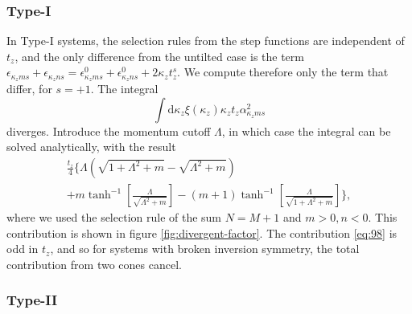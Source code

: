 \subsubsection{Type-I}
In Type-I systems, the selection rules from the step functions are independent of \( t_z \), and the only difference from the untilted case is the term \( \epsilon_{\kappa_z m s} + \epsilon_{\kappa_z n s} = \epsilon^0_{\kappa_z m s} + \epsilon^0_{\kappa_z n s} + 2 \kappa_z t^s_z \).
We compute therefore only the term that differ, for \( s=+1 \).
The integral
\begin{equation}
  \label{eq:97}
  \int \mathrm{d}\kappa_z \xi(\kappa_z) \kappa_z t_z \alpha_{\kappa_z m s}^2
\end{equation}
diverges.
Introduce the momentum cutoff \( \Lambda \), in which case the integral can be solved analytically, with the result
\begin{multline}
  \frac{t_z}{4}
  \Bigg\{
    \Lambda\left(\sqrt{1 + \Lambda^2 + m} - \sqrt{\Lambda^2 + m}  \right)\\
    + m \tanh^{-1}\left[\frac{\Lambda}{\sqrt{\Lambda^2 + m} } \right]
    - (m+1) \tanh^{-1}\left[\frac{\Lambda}{\sqrt{1 + \Lambda^2 + m }}\right]
    \Bigg\},
    \label{eq:98}
\end{multline}
where we used the selection rule of the sum \( N=M+1 \) and \( m>0, n<0 \).
This contribution is shown in figure \ref{fig:divergent-factor}.
The contribution \eqref{eq:98} is odd in \( t_z \), and so for systems with broken inversion symmetry, the total contribution from two cones cancel.


\subsubsection{Type-II}


